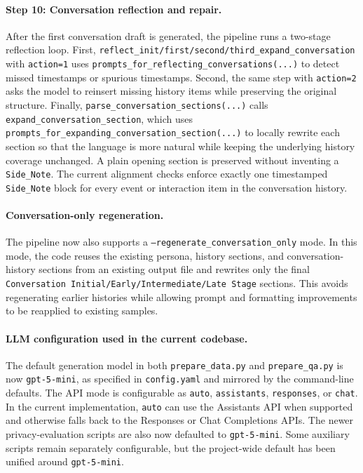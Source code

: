 \paragraph{Step 10: Conversation reflection and repair.}
After the first conversation draft is generated, the pipeline runs a two-stage reflection loop. First, \texttt{reflect\_init/first/second/third\_expand\_conversation} with \texttt{action=1} uses \texttt{prompts\_for\_reflecting\_conversations(...)} to detect missed timestamps or spurious timestamps. Second, the same step with \texttt{action=2} asks the model to reinsert missing history items while preserving the original structure. Finally, \texttt{parse\_conversation\_sections(...)} calls \texttt{expand\_conversation\_section}, which uses \texttt{prompts\_for\_expanding\_conversation\_section(...)} to locally rewrite each section so that the language is more natural while keeping the underlying history coverage unchanged. A plain opening section is preserved without inventing a \texttt{Side\_Note}. The current alignment checks enforce exactly one timestamped \texttt{Side\_Note} block for every event or interaction item in the conversation history.

\paragraph{Conversation-only regeneration.}
The pipeline now also supports a \texttt{--regenerate\_conversation\_only} mode. In this mode, the code reuses the existing persona, history sections, and conversation-history sections from an existing output file and rewrites only the final \texttt{Conversation Initial/Early/Intermediate/Late Stage} sections. This avoids regenerating earlier histories while allowing prompt and formatting improvements to be reapplied to existing samples.

\paragraph{LLM configuration used in the current codebase.}
The default generation model in both \texttt{prepare\_data.py} and \texttt{prepare\_qa.py} is now \texttt{gpt-5-mini}, as specified in \texttt{config.yaml} and mirrored by the command-line defaults. The API mode is configurable as \texttt{auto}, \texttt{assistants}, \texttt{responses}, or \texttt{chat}. In the current implementation, \texttt{auto} can use the Assistants API when supported and otherwise falls back to the Responses or Chat Completions APIs. The newer privacy-evaluation scripts are also now defaulted to \texttt{gpt-5-mini}. Some auxiliary scripts remain separately configurable, but the project-wide default has been unified around \texttt{gpt-5-mini}.

